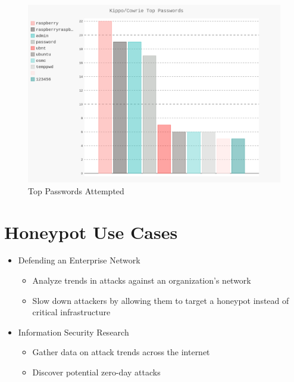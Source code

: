 \documentclass[a0,landscape]{a0poster}
\begin{document}
\begin{multicols}{3}
\begin{figure}[H]
	\begin{center}
		\includegraphics[width=20cm]{images/top_pass.png}
		\caption{Top Passwords Attempted}
	\end{center}
\end{figure}



\section*{Honeypot Use Cases}
\begin{itemize}
	\item Defending an Enterprise Network
	\begin{itemize}
		\item Analyze trends in attacks against an organization's network
		\item Slow down attackers by allowing them to target a honeypot instead of critical infrastructure
	\end{itemize}
		\item Information Security Research
	\begin{itemize}
		\item Gather data on attack trends across the internet
		\item Discover potential zero-day attacks
	\end{itemize}
\end{itemize}


\end{multicols}
\end{document}

